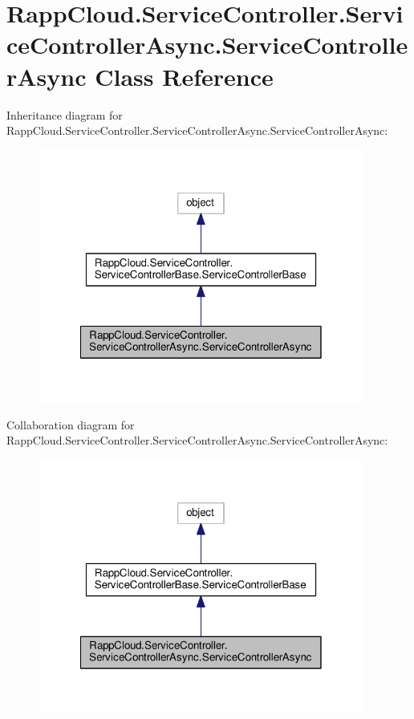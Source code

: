 \hypertarget{classRappCloud_1_1ServiceController_1_1ServiceControllerAsync_1_1ServiceControllerAsync}{\section{Rapp\-Cloud.\-Service\-Controller.\-Service\-Controller\-Async.\-Service\-Controller\-Async Class Reference}
\label{classRappCloud_1_1ServiceController_1_1ServiceControllerAsync_1_1ServiceControllerAsync}
}


Inheritance diagram for Rapp\-Cloud.\-Service\-Controller.\-Service\-Controller\-Async.\-Service\-Controller\-Async\-:
\nopagebreak
\begin{figure}[H]
\begin{center}
\leavevmode
\includegraphics[width=304pt]{classRappCloud_1_1ServiceController_1_1ServiceControllerAsync_1_1ServiceControllerAsync__inherit__graph}
\end{center}
\end{figure}


Collaboration diagram for Rapp\-Cloud.\-Service\-Controller.\-Service\-Controller\-Async.\-Service\-Controller\-Async\-:
\nopagebreak
\begin{figure}[H]
\begin{center}
\leavevmode
\includegraphics[width=304pt]{classRappCloud_1_1ServiceController_1_1ServiceControllerAsync_1_1ServiceControllerAsync__coll__graph}
\end{center}
\end{figure}
